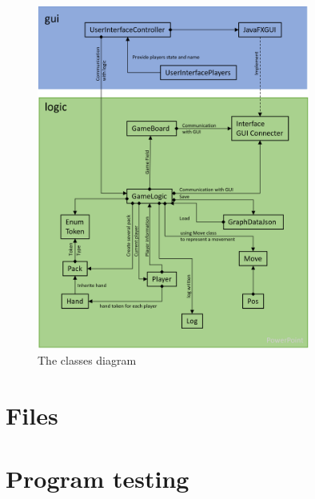 \begin{figure}[h]
	\centering
	\includegraphics[width=0.8\textwidth]{image/diagram_1}
	\caption{The classes diagram}
	\label{fig:All classes diagram}
\end{figure}



\newpage




\section{Files}





\newpage
\section{Program testing}



\newpage


\newpage


\newpage


\newpage


\newpage


